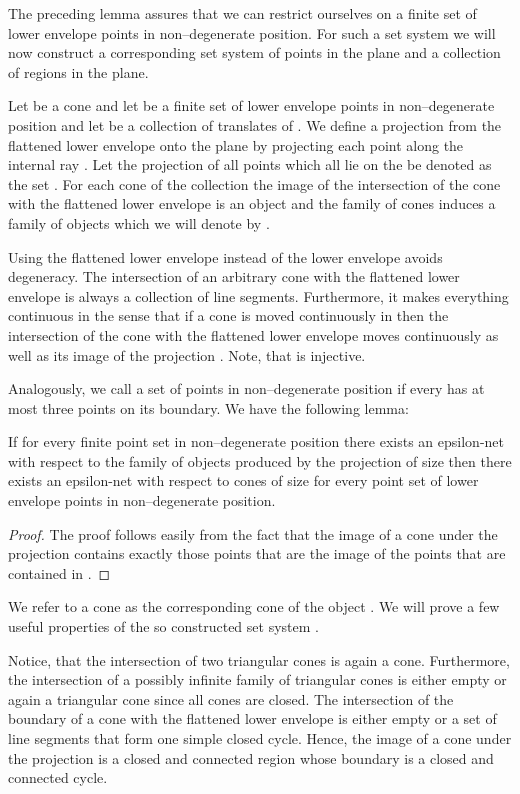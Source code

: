 \documentclass{stacs_proc}
\begin{document}
The preceding lemma assures that we can restrict ourselves on a finite
set of lower envelope points in non--degenerate position. For such
a set system we will now construct a corresponding set system of
points in the plane and a collection of regions in the plane. 


\begin{defi}
  Let  be a cone and let  be a finite set of lower envelope
  points in non--degenerate position and let  be a collection
  of translates of . We define a projection  from the flattened
  lower envelope onto the plane  by projecting each point along
  the internal ray . Let the projection of all points 
  which all lie on the be denoted as the set . For each cone of the
  collection the image of the intersection of the cone with the
  flattened lower envelope is an object  and the family 
  of cones induces a family of objects which we will denote by . 
\end{defi}
Using the flattened lower envelope instead of the lower
envelope avoids degeneracy. The intersection of an arbitrary cone with
the flattened lower envelope is always a collection of line
segments. Furthermore, it makes everything continuous in the
sense that if a cone is moved continuously in  then the
intersection of the cone with the flattened lower envelope moves
continuously as well as its image of the projection . Note, that
 is injective.  

Analogously, we call a set of points  in non--degenerate
position if every  has at most three points on its boundary. 
We have the following lemma:
\begin{lemma}
  \label{lem:2}
  If for every finite point set  in non--degenerate
  position there exists 
  an epsilon-net with respect to the family of objects 
  produced by the projection  of size  then there exists 
  an epsilon-net with respect to cones of size  for every point
  set  of lower envelope points  in non--degenerate position.
\end{lemma}
\begin{proof}
  The proof follows easily from the fact that the image of a cone 
  under the projection  contains exactly those points that are the
  image of the points that are contained in . 
\end{proof}

We refer to a cone  as the corresponding cone of the object
. We will prove a few useful properties of the so constructed
set system . 

Notice, that the intersection of two triangular cones is again a
cone. Furthermore, the intersection of a possibly infinite family of
triangular cones is either empty or again a triangular cone since all
cones are closed. The intersection of the boundary of a cone with the
flattened lower envelope is either empty or a set of line segments
that form one simple closed cycle. Hence, the image of a cone under
the projection  is a closed and connected region whose boundary is
a closed and connected cycle. 
  
\end{document}
